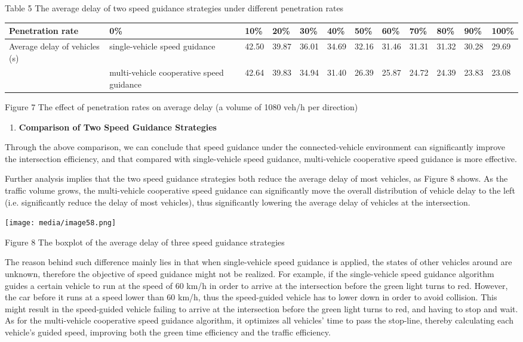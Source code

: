 Table 5 The average delay of two speed guidance strategies under
different penetration rates

\begin{longtable}[c]{@{}llllllllllll@{}}
\toprule
Penetration rate & 0\% & 10\% & 20\% & 30\% & 40\% & 50\% & 60\% & 70\%
& 80\% & 90\% & 100\%\tabularnewline
\midrule
\endhead
Average delay of vehicles (s) & single-vehicle speed guidance & 42.50 &
39.87 & 36.01 & 34.69 & 32.16 & 31.46 & 31.31 & 31.32 & 30.28 &
29.69\tabularnewline
& multi-vehicle cooperative speed guidance & 42.64 & 39.83 & 34.94 &
31.40 & 26.39 & 25.87 & 24.72 & 24.39 & 23.83 & 23.08\tabularnewline
\bottomrule
\end{longtable}

Figure 7 The effect of penetration rates on average delay (a volume of
1080 veh/h per direction)

\begin{enumerate}
\def\labelenumi{\arabic{enumi}.}
\item
  \textbf{Comparison of Two Speed Guidance Strategies}
\end{enumerate}

Through the above comparison, we can conclude that speed guidance under
the connected-vehicle environment can significantly improve the
intersection efficiency, and that compared with single-vehicle speed
guidance, multi-vehicle cooperative speed guidance is more effective.

Further analysis implies that the two speed guidance strategies both
reduce the average delay of most vehicles, as Figure 8 shows. As the
traffic volume grows, the multi-vehicle cooperative speed guidance can
significantly move the overall distribution of vehicle delay to the left
(i.e. significantly reduce the delay of most vehicles), thus
significantly lowering the average delay of vehicles at the
intersection.

\texttt{[image: media/image58.png]}

Figure 8 The boxplot of the average delay of three speed guidance
strategies

The reason behind such difference mainly lies in that when
single-vehicle speed guidance is applied, the states of other vehicles
around are unknown, therefore the objective of speed guidance might not
be realized. For example, if the single-vehicle speed guidance algorithm
guides a certain vehicle to run at the speed of 60 km/h in order to
arrive at the intersection before the green light turns to red. However,
the car before it runs at a speed lower than 60 km/h, thus the
speed-guided vehicle has to lower down in order to avoid collision. This
might result in the speed-guided vehicle failing to arrive at the
intersection before the green light turns to red, and having to stop and
wait. As for the multi-vehicle cooperative speed guidance algorithm, it
optimizes all vehicles' time to pass the stop-line, thereby calculating
each vehicle's guided speed, improving both the green time efficiency
and the traffic efficiency.


